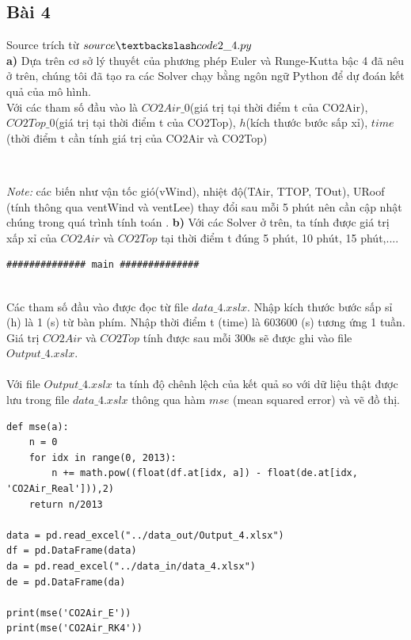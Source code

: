 \documentclass[a4paper]{article}
\begin{document}
\subsection{Bài 4}
Source trích từ $source\textbackslash code2\_4.py$\\
\textbf{a)} Dựa trên cơ sở lý thuyết của phương phép Euler và Runge-Kutta bậc 4 đã nêu ở trên, chúng tôi đã tạo ra các Solver chạy bằng ngôn ngữ Python để dự đoán kết quả của mô hình.\\
Với các tham số đầu vào là $CO2Air\_0$(giá trị tại thời điểm t của CO2Air), $CO2Top\_0$(giá trị tại thời điểm t của CO2Top), $h$(kích thước bước sấp xỉ), $time$(thời điểm t cần tính giá trị của CO2Air và CO2Top)

\begin{verbatim}


\end{verbatim}
    \textit{Note: } các biến như vận tốc gió(vWind), nhiệt độ(TAir, TTOP, TOut), URoof (tính thông qua ventWind và ventLee) thay đổi sau mỗi 5 phút nên cần cập nhật chúng trong quá trình tính toán .
\textbf{b)}
Với các Solver ở trên, ta tính được giá trị xấp xỉ của $CO2Air$ và $CO2Top$ tại thời điểm t đúng 5 phút, 10 phút, 15 phút,....
\begin{verbatim}
############## main ##############

\end{verbatim}
\\
Các tham số đầu vào được đọc từ file $data\_4.xslx$. Nhập kích thước bước sấp sỉ (h) là 1 (s) từ bàn phím. Nhập thời điểm t (time) là 603600 (s) tương ứng 1 tuần. Giá trị $CO2Air$ và $CO2Top$ tính được sau mỗi 300s sẽ được ghi vào file $Output\_4.xslx$.
\\\\
Với file $Output\_4.xslx$ ta tính độ chênh lệch của kết quả so với dữ liệu thật được lưu trong file $data\_4.xslx$ thông qua hàm $mse$ (mean squared error) và vẽ đồ thị.


\begin{verbatim}
def mse(a):
    n = 0
    for idx in range(0, 2013):
        n += math.pow((float(df.at[idx, a]) - float(de.at[idx, 'CO2Air_Real'])),2)
    return n/2013

data = pd.read_excel("../data_out/Output_4.xlsx")
df = pd.DataFrame(data)
da = pd.read_excel("../data_in/data_4.xlsx")
de = pd.DataFrame(da)

print(mse('CO2Air_E'))
print(mse('CO2Air_RK4'))
\end{verbatim}\\
\end{document}
